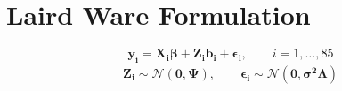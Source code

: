 \documentclass[Chap4amain.tex]{subfiles}
\begin{document}
\newpage
\section{Laird Ware Formulation}
\begin{equation}
\boldsymbol{y_{i}} = \boldsymbol{X_{i}\beta}  + \boldsymbol{Z_{i}b_{i}} + \boldsymbol{\epsilon_{i}}, \qquad i=1,\dots,85
\end{equation}
\begin{eqnarray}
\boldsymbol{Z_{i}} \sim \mathcal{N}(\boldsymbol{0,\Psi}),\qquad
\boldsymbol{\epsilon_{i}} \sim \mathcal{N}(\boldsymbol{0,\sigma^2\Lambda})
\end{eqnarray}
\end{document}
